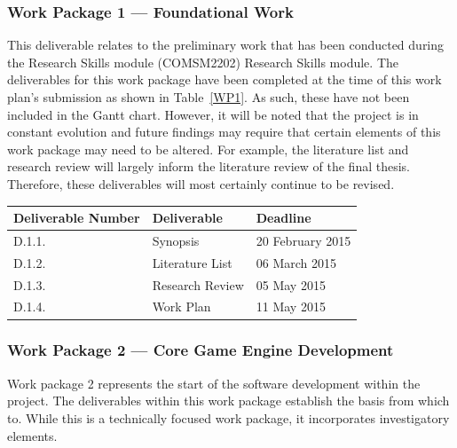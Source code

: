 \documentclass[a4paper]{article}
\begin{document}
\subsubsection{Work Package 1 --- Foundational Work}

This deliverable relates to the preliminary work that has been conducted during the Research Skills
module (COMSM2202) Research Skills module.  The deliverables for this work package have been
completed at the time of this work plan's submission  as shown in Table~\ref{WP1}. As such, these
have not been included in the Gantt chart. However, it will be noted that the project is in constant
evolution and future findings may require that certain elements of this work package may need to be
altered. For example, the literature list and research review will largely inform the literature
review of the final thesis. Therefore, these deliverables will most certainly continue to be
revised.

\begin{center}
    \begin{tabular}{ | l | l | l |}
    \hline
    \rowcolor{Gray}
    Deliverable Number & Deliverable & Deadline \\ \hline

    D.1.1. & Synopsis & 20 February 2015 \\ \hline

    D.1.2. & Literature List & 06 March 2015 \\ \hline

    D.1.3. & Research Review & 05 May 2015 \\ \hline

    D.1.4. & Work Plan & 11 May 2015 \\ \hline


    \end{tabular}

\label{WP1}
\end{center}

\subsubsection{Work Package 2 --- Core Game Engine Development}

Work package 2 represents the start of the software development within the project. The deliverables
within this work package establish the basis from which to. While this is a technically focused work
package, it incorporates investigatory elements.
\end{document}

